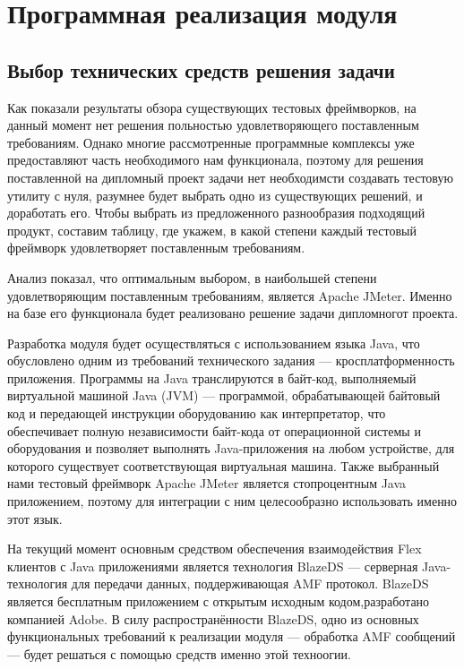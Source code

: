 \chapter{Программная реализация модуля}

\section{Выбор технических средств решения задачи}

Как показали результаты обзора существующих тестовых фреймворков, на данный момент нет решения польностью
удовлетворяющего поставленным требованиям. Однако многие рассмотренные программные комплексы уже предоставляют часть
необходимого нам функционала, поэтому для решения поставленной на дипломный
проект задачи нет необходимсти создавать тестовую утилиту с нуля, разумнее
будет выбрать одно из существующих решений, и доработать его.
Чтобы выбрать из предложенного разнообразия подходящий продукт, составим таблицу, где укажем, в какой степени каждый
тестовый фреймворк удовлетворяет поставленным требованиям.

Анализ показал, что оптимальным выбором, в наибольшей степени удовлетворяющим поставленным требованиям, является
Apache JMeter. Именно на базе его функционала будет реализовано решение задачи дипломногот проекта.

Разработка модуля будет осуществляться с использованием языка Java, что обусловлено одним из требований технического
задания --- кросплатформенность приложения. Программы на Java транслируются в байт-код, выполняемый виртуальной машиной
Java (JVM) --- программой, обрабатывающей байтовый код и передающей инструкции оборудованию как интерпретатор, что
обеспечивает полную независимости байт-кода от операционной системы и оборудования и позволяет выполнять
Java-приложения на любом устройстве, для которого существует соответствующая виртуальная машина. Также выбранный нами
тестовый фреймворк Apache JMeter является стопроцентным Java приложением, поэтому для интеграции с ним целесообразно
использовать именно этот язык.

На текущий момент основным средством обеспечения взаимодействия Flex клиентов с Java приложениями является технология
BlazeDS --- серверная Java-технология для передачи данных, поддерживающая AMF протокол. BlazeDS является бесплатным
приложением с открытым исходным кодом,разработано компанией Adobe. В силу распространённости BlazeDS, одно из основных
функциональных требований к реализации модуля --- обработка AMF сообщений --- будет решаться с помощью средств именно
этой техноогии.


